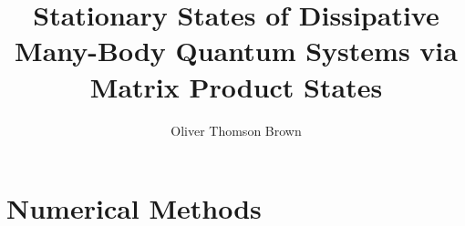 \documentclass[a4paper,oneside,12pt]{hwthesis}
\author{Oliver Thomson Brown}
\title{Stationary States of Dissipative Many-Body Quantum Systems via Matrix Product States}
\newcommand*{\chappath}{../../include/chapters}
\newcommand*{\refpath}{../../include/refs}
\begin{document}
\maketitle
\tableofcontents

\chapter{Numerical Methods}





\end{document}
